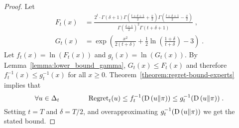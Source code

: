 \begin{proof}
Let
\begin{align*}
F_t(x) & = \frac{2^t \cdot \Gamma(\delta + 1) \Gamma(\frac{t+\delta+1}{2} + \frac{x}{2}) \Gamma(\frac{t+\delta+1}{2} - \frac{x}{2})}{\Gamma(\frac{\delta+1}{2})^2 \Gamma(t+\delta+1)} \; , \\
G_t(x) & = \exp\left(\frac{x^2}{2(t+\delta)} +\frac{1}{2} \ln \left(\frac{1+\delta}{t+\delta}\right) - 3\right) \; .
\end{align*}
Let $f_t(x) = \ln(F_t(x))$ and $g_t(x)=\ln(G_t(x))$. By Lemma~\ref{lemma:lower_bound_gamma}, $G_t(x) \le F_t(x)$
and therefore $f^{-1}_t(x) \leq g^{-1}_t(x)$ for all $x \ge 0$.
Theorem~\ref{theorem:regret-bound-experts} implies that
\[
\forall u \in \Delta_t \qquad \qquad
\operatorname{Regret}_t(u) \le f_t^{-1}(\operatorname*{D}\left({u}\middle\|{\pi}\right)) \le g_t^{-1}(\operatorname*{D}\left({u}\middle\|{\pi}\right)) \; .
\]
Setting $t=T$ and $\delta = T/2$, and overapproximating $g_t^{-1}(\operatorname*{D}\left({u}\middle\|{\pi}\right))$ we get the stated bound.
\end{proof}
